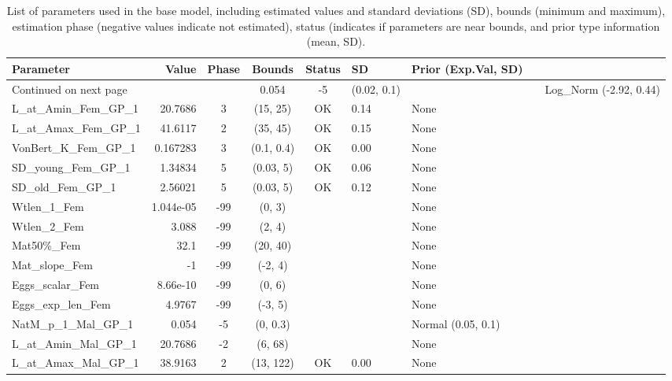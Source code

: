 \documentclass[12pt,]{article}
\begin{document}
\begin{landscape}
\begin{longtable}{lrcccll}
\caption{List of parameters used in
                                          the base model, including estimated 
                                          values and standard deviations (SD), 
                                          bounds (minimum and maximum), 
                                          estimation phase (negative values indicate
                                          not estimated), status (indicates if 
                                          parameters are near bounds, and prior type
                                          information (mean, SD).} \\ 
  \hline
Parameter & Value & Phase & Bounds & Status & SD & Prior (Exp.Val, SD)  \\ 
  \hline 
\endhead 
\hline 
\multicolumn{3}{l}{\footnotesize Continued on next page} 
\endfoot 
\endlastfoot 
 \hline
NatM\_p\_1\_Fem\_GP\_1 & 0.054 & -5 & (0.02, 0.1) &  &  & Log\_Norm (-2.92, 0.44) \\ 
  L\_at\_Amin\_Fem\_GP\_1 & 20.7686 & 3 & (15, 25) & OK & 0.14 & None \\ 
  L\_at\_Amax\_Fem\_GP\_1 & 41.6117 & 2 & (35, 45) & OK & 0.15 & None \\ 
  VonBert\_K\_Fem\_GP\_1 & 0.167283 & 3 & (0.1, 0.4) & OK & 0.00 & None \\ 
  SD\_young\_Fem\_GP\_1 & 1.34834 & 5 & (0.03, 5) & OK & 0.06 & None \\ 
  SD\_old\_Fem\_GP\_1 & 2.56021 & 5 & (0.03, 5) & OK & 0.12 & None \\ 
  Wtlen\_1\_Fem & 1.044e-05 & -99 & (0, 3) &  &  & None \\ 
  Wtlen\_2\_Fem & 3.088 & -99 & (2, 4) &  &  & None \\ 
  Mat50\%\_Fem & 32.1 & -99 & (20, 40) &  &  & None \\ 
  Mat\_slope\_Fem & -1 & -99 & (-2, 4) &  &  & None \\ 
  Eggs\_scalar\_Fem & 8.66e-10 & -99 & (0, 6) &  &  & None \\ 
  Eggs\_exp\_len\_Fem & 4.9767 & -99 & (-3, 5) &  &  & None \\ 
  NatM\_p\_1\_Mal\_GP\_1 & 0.054 & -5 & (0, 0.3) &  &  & Normal (0.05, 0.1) \\ 
  L\_at\_Amin\_Mal\_GP\_1 & 20.7686 & -2 & (6, 68) &  &  & None \\ 
  L\_at\_Amax\_Mal\_GP\_1 & 38.9163 & 2 & (13, 122) & OK & 0.00 & None \\ 

\end{longtable}
\end{landscape}
\end{document}
